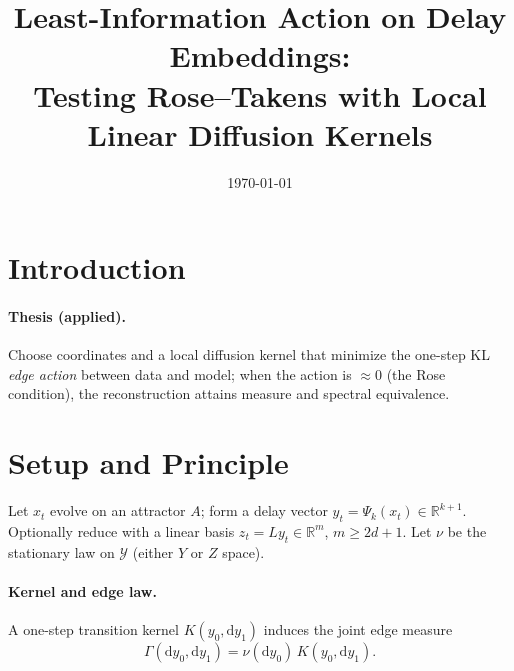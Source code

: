 \documentclass[11pt]{article}
\title{Least-Information Action on Delay Embeddings: \\
Testing Rose--Takens with Local Linear Diffusion Kernels}
\author{%
}
\date{\today}
\newcommand{\R}{\mathbb{R}}
\newcommand{\Y}{\mathcal{Y}}
\begin{document}
\maketitle

\begin{abstract}
\noindent
\end{abstract}

\section{Introduction}

\paragraph{Thesis (applied).}
Choose coordinates and a local diffusion kernel that minimize the one-step KL \emph{edge action} between data and model; when the action is $\approx 0$ (the Rose condition), the reconstruction attains measure and spectral equivalence.

\section{Setup and Principle}
\label{sec:setup}
Let $x_t$ evolve on an attractor $A$; form a delay vector $y_t=\Psi_k(x_t)\in\R^{k+1}$.
Optionally reduce with a linear basis $z_t=Ly_t\in\R^{m}$, $m\ge 2d+1$.
Let $\nu$ be the stationary law on $\Y$ (either $Y$ or $Z$ space).

\paragraph{Kernel and edge law.}
A one-step transition kernel $K(y_0,\mathrm{d}y_1)$ induces the joint edge measure
\begin{equation}
\Gamma(\mathrm{d}y_0,\mathrm{d}y_1)=\nu(\mathrm{d}y_0)\,K(y_0,\mathrm{d}y_1).
\end{equation}
\end{document}
